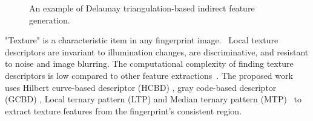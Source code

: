 \begin{figure}[!ht]
	\centering
	 
	\caption{An example of Delaunay triangulation-based indirect feature generation.}
	\label{fig:relative}
	\vspace{-6mm}
\end{figure}

\par

"Texture" is a characteristic item in any fingerprint image. ~Local texture
descriptors are invariant to illumination changes, are discriminative, and
resistant to noise and image blurring. The computational complexity of finding
texture descriptors is low compared to other feature extractions~\cite{li2019learning}.
The proposed work uses Hilbert curve-based descriptor (HCBD)  \cite{Ebrahim2009hcbd}, gray code-based
descriptor (GCBD) \cite{Zhao2008gcbd}, Local ternary pattern (LTP) \cite{tan2010enhanced} and Median
ternary pattern (MTP)~\cite{bashar2014robust} to extract texture features from
the fingerprint's consistent region.

